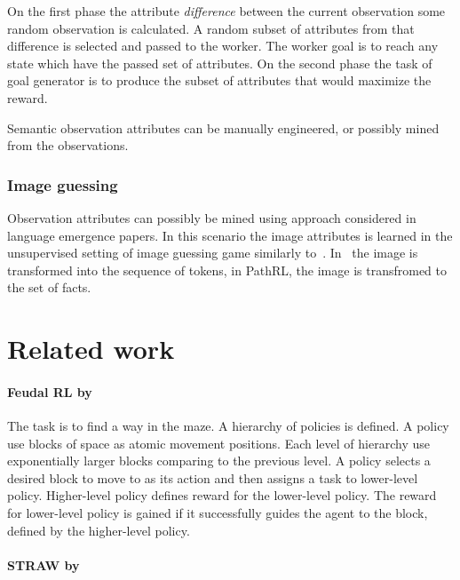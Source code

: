 \documentclass[acmsmall, nonacm]{acmart}
\begin{document}
On the first phase the attribute \textit{difference} between the current observation some random observation is calculated. A random subset of attributes from that difference is selected and passed to the worker. The worker goal is to reach any state which have the passed set of attributes. On the second phase the task of goal generator is to produce the subset of attributes that would maximize the reward.

Semantic observation attributes can be manually engineered, or possibly mined from the observations.

\subsubsection{Image guessing}

Observation attributes can possibly be mined using approach considered in language emergence papers. In this scenario the image attributes is learned in the unsupervised setting of image guessing game similarly to~\citet{Havrylov2017EmergenceOL}. In~\citet{Havrylov2017EmergenceOL} the image is transformed into the sequence of tokens, in PathRL, the image is transfromed to the set of facts.

\section{Related work}
\label{sec:related_work}

\paragraph{Feudal RL by~\citet{Dayan1992FeudalRL}} %
\label{par:feudal_rl}

The task is to find a way in the maze. A hierarchy of policies is defined. A policy use blocks of space as atomic movement positions. Each level of hierarchy use exponentially larger blocks comparing to the previous level. A policy selects a desired block to move to as its action and then assigns a task to lower-level policy. Higher-level policy defines reward for the lower-level policy. The reward for lower-level policy is gained if it successfully guides the agent to the block, defined by the higher-level policy.


\paragraph{STRAW by~\citet{Vezhnevets2016StrategicAW}} %
\label{par:straw}
\end{document}
